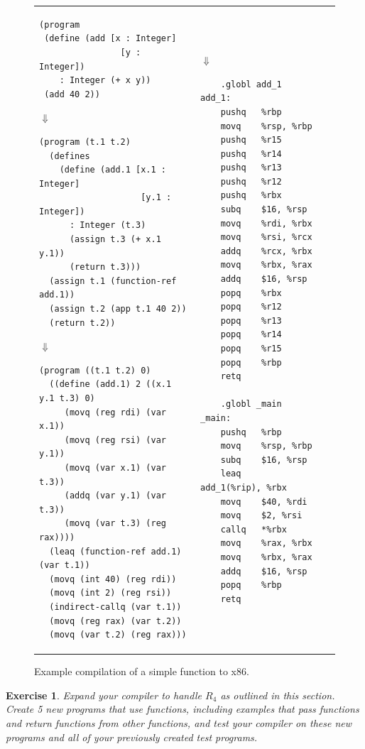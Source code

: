 \documentclass[11pt]{book}
\newtheorem{exercise}[theorem]{Exercise}
\begin{document}
\begin{figure}[tbp]
\begin{tabular}{lll}
\begin{minipage}{0.5\textwidth}
\begin{lstlisting}
(program
 (define (add [x : Integer] 
                [y : Integer]) 
    : Integer (+ x y))
 (add 40 2))
\end{lstlisting}
$\Downarrow$
\begin{lstlisting}
(program (t.1 t.2)
  (defines 
    (define (add.1 [x.1 : Integer] 
                    [y.1 : Integer])
      : Integer (t.3)
      (assign t.3 (+ x.1 y.1))
      (return t.3)))
  (assign t.1 (function-ref add.1))
  (assign t.2 (app t.1 40 2))
  (return t.2))
\end{lstlisting}
$\Downarrow$
\begin{lstlisting}
(program ((t.1 t.2) 0)
  ((define (add.1) 2 ((x.1 y.1 t.3) 0)
     (movq (reg rdi) (var x.1))
     (movq (reg rsi) (var y.1))
     (movq (var x.1) (var t.3))
     (addq (var y.1) (var t.3))
     (movq (var t.3) (reg rax))))
  (leaq (function-ref add.1) (var t.1))
  (movq (int 40) (reg rdi))
  (movq (int 2) (reg rsi))
  (indirect-callq (var t.1))
  (movq (reg rax) (var t.2))
  (movq (var t.2) (reg rax)))
\end{lstlisting}
\end{minipage}
&
\begin{minipage}{0.4\textwidth}
$\Downarrow$
\begin{lstlisting}
	.globl add_1
add_1:
	pushq	%rbp
	movq	%rsp, %rbp
	pushq	%r15
	pushq	%r14
	pushq	%r13
	pushq	%r12
	pushq	%rbx
	subq	$16, %rsp
	movq	%rdi, %rbx
	movq	%rsi, %rcx
	addq	%rcx, %rbx
	movq	%rbx, %rax
	addq	$16, %rsp
	popq	%rbx
	popq	%r12
	popq	%r13
	popq	%r14
	popq	%r15
	popq	%rbp
	retq

	.globl _main
_main:
	pushq	%rbp
	movq	%rsp, %rbp
	subq	$16, %rsp
	leaq	add_1(%rip), %rbx
	movq	$40, %rdi
	movq	$2, %rsi
	callq	*%rbx
	movq	%rax, %rbx
	movq	%rbx, %rax
	addq	$16, %rsp
	popq	%rbp
	retq
\end{lstlisting}
\end{minipage}
\end{tabular} 
\caption{Example compilation of a simple function to x86.}
\label{fig:add-fun}
\end{figure}



\begin{exercise}\normalfont
Expand your compiler to handle $R_4$ as outlined in this section.
Create 5 new programs that use functions, including examples that pass
functions and return functions from other functions, and test your
compiler on these new programs and all of your previously created test
programs.
\end{exercise}
\end{document}
